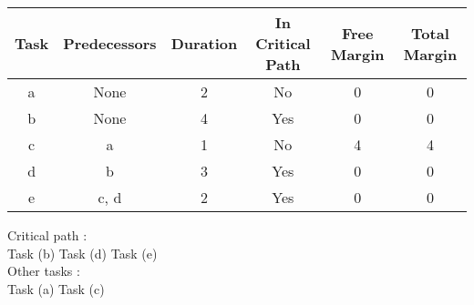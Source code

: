 \documentclass{article}
\begin{document}
\begin{center}
\begin{tabular}{|c| c| c| c| c| c|}
 \hline
 Task & Predecessors & Duration & In Critical Path & Free Margin & Total Margin\\ [0.5ex]\hline
a & None & 2 & No & 0 & 0 \\
\hline
b & None & 4 & Yes & 0 & 0 \\
\hline
c & a & 1 & No & 4 & 4 \\
\hline
d & b & 3 & Yes & 0 & 0 \\
\hline
e & c, d & 2 & Yes & 0 & 0 \\
\hline
\end{tabular}
\begin{center}
Critical path : \\
Task (b)  \Rightarrow  Task (d)  \Rightarrow  Task (e)\\
Other tasks : \\
Task (a)  \Rightarrow  Task (c)\\
\end{center}\end{center}
\end{document}
